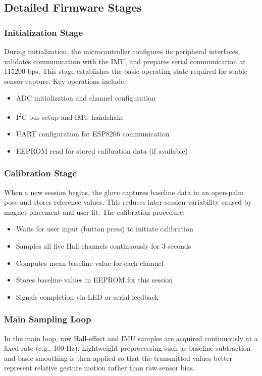 \documentclass[12pt,a4paper]{report}
\begin{document}
\subsection{Detailed Firmware Stages}

\subsubsection{Initialization Stage}
During initialization, the microcontroller configures its peripheral interfaces, validates communication with the IMU, and prepares serial communication at 115200 bps. This stage establishes the basic operating state required for stable sensor capture. Key operations include:
\begin{itemize}
  \item ADC initialization and channel configuration
  \item I\textsuperscript{2}C bus setup and IMU handshake
  \item UART configuration for ESP8266 communication
  \item EEPROM read for stored calibration data (if available)
\end{itemize}

\subsubsection{Calibration Stage}
When a new session begins, the glove captures baseline data in an open-palm pose and stores reference values. This reduces inter-session variability caused by magnet placement and user fit. The calibration procedure:
\begin{itemize}
  \item Waits for user input (button press) to initiate calibration
  \item Samples all five Hall channels continuously for 3 seconds
  \item Computes mean baseline value for each channel
  \item Stores baseline values in EEPROM for this session
  \item Signals completion via LED or serial feedback
\end{itemize}

\subsubsection{Main Sampling Loop}
In the main loop, raw Hall-effect and IMU samples are acquired continuously at a fixed rate (e.g., 100 Hz). Lightweight preprocessing such as baseline subtraction and basic smoothing is then applied so that the transmitted values better represent relative gesture motion rather than raw sensor bias.
\end{document}
